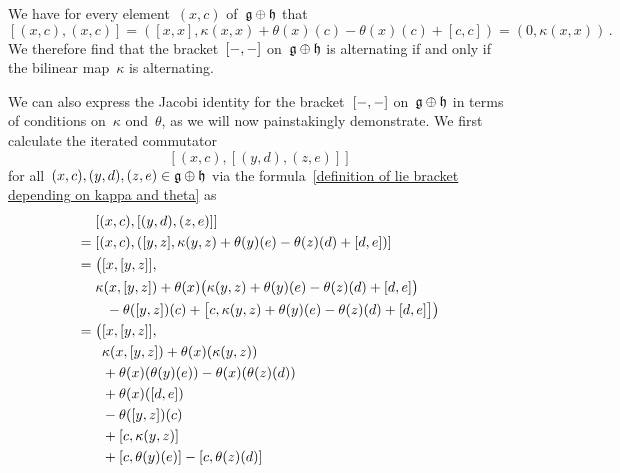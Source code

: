 \begin{fluff}
\begin{enumerate}
			We have for every element~$(x,c)$ of~$\mathfrak{g} \oplus \mathfrak{h}$ that
			\[
				[(x,c), (x,c)]
				=
				( [x,x], \kappa(x,x) + \theta(x)(c) - \theta(x)(c) + [c,c] )
				=
				(0, \kappa(x,x) ) \,.
			\]
			We therefore find that the bracket~$[-, -]$ on~$\mathfrak{g} \oplus \mathfrak{h}$ is alternating if and only if the bilinear map~$\kappa$ is alternating.

			We can also express the Jacobi identity for the bracket~$[-, -]$ on~$\mathfrak{g} \oplus \mathfrak{h}$ in terms of conditions on~$\kappa$ ond~$\theta$, as we will now painstakingly demonstrate.
			We first calculate the iterated commutator
			\[
				[(x,c), [(y,d), (z,e)]]
			\]
			for all~$(x,c), (y,d), (z,e) \in \mathfrak{g} \oplus \mathfrak{h}$ via the formula~\eqref{definition of lie bracket depending on kappa and theta} as
			\begin{align}
				{}&
				[(x,c), [(y,d), (z,e)]]
				\notag
				\\
				={}&
				[(x,c), ([y,z], \kappa(y,z) + \theta(y)(e) - \theta(z)(d) + [d,e])]
				\notag
				\\
				={}&
				\bigl(
					[x, [y, z]], 
				\notag
				\\
				{}&
					\kappa( x, [y, z] )
					+ \theta(x)
						\bigl(
							\kappa(y,z) + \theta(y)(e) - \theta(z)(d) + [d,e]
						\bigr)
				\notag
				\\
				{}&
				\hphantom{\biggl(}
					- \theta([y,z])(c)
					+ \bigl[
							c,
							\kappa(y,z) + \theta(y)(e) - \theta(z)(d) + [d,e]
						\bigr]
				\bigr)
				\notag
				\\
				={}&
				\smash{\bigl(}
					[x, [y, z]],
				\notag
				\\
				{}&
				\hphantom{\bigl(}
					\kappa( x, [y, z] )
					+ \theta(x)( \kappa(y,z) )
				\label{ugly row 1}
				\\
				{}&
				\hphantom{\bigl(}
					+ \theta(x)( \theta(y)(e) )
					- \theta(x)( \theta(z)(d) )
				\label{ugly row 2}
				\\
				{}&
				\hphantom{\bigl(}
					+ \theta(x)( [d,e] )
				\label{ugly row 3}
				\\
				{}&
				\hphantom{\bigl(}
					- \theta( [y,z] )(c)
				\label{ugly row 4}
				\\
				{}&
				\hphantom{\bigl(}
					+ [c, \kappa(y,z)]
				\label{ugly row 5}
				\\
				{}&
				\hphantom{\bigl(}
					+ [c, \theta(y)(e)]
					- [c, \theta(z)(d)]
				\label{ugly row 6}

\end{align}
\end{enumerate}
\end{fluff}
